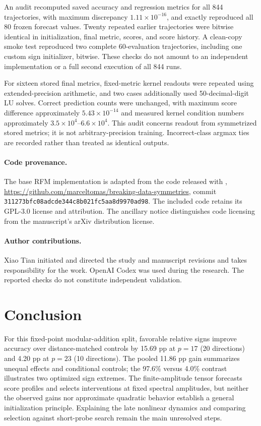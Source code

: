 \documentclass[11pt]{article}
\begin{document}
An audit recomputed saved accuracy and regression metrics for all 844 trajectories, with maximum discrepancy $1.11\times10^{-16}$, and exactly reproduced all 80 frozen forecast values. Twenty repeated earlier trajectories were bitwise identical in initialization, final metric, scores, and score history. A clean-copy smoke test reproduced two complete 60-evaluation trajectories, including one custom sign initializer, bitwise. These checks do not amount to an independent implementation or a full second execution of all 844 runs.

For sixteen stored final metrics, fixed-metric kernel readouts were repeated using extended-precision arithmetic, and two cases additionally used 50-decimal-digit LU solves. Correct prediction counts were unchanged, with maximum score difference approximately $5.43\times10^{-14}$ and measured kernel condition numbers approximately $3.5\times10^4$--$6.6\times10^4$. This audit concerns readout from symmetrized stored metrics; it is not arbitrary-precision training. Incorrect-class argmax ties are recorded rather than treated as identical outputs.

\paragraph{Code provenance.}
The base RFM implementation is adapted from the code released with \citet{bernal2026}, \url{https://github.com/marceltomas/breaking-data-symmetries}, commit \texttt{311273bfc08adcde344c8b021fc5aa8d9970ad98}. The included code retains its GPL-3.0 license and attribution. The ancillary notice distinguishes code licensing from the manuscript's arXiv distribution license.

\paragraph{Author contributions.}
Xiao Tian initiated and directed the study and manuscript revisions and takes responsibility for the work. OpenAI Codex was used during the research. The reported checks do not constitute independent validation.

\section{Conclusion}
For this fixed-point modular-addition split, favorable relative signs improve accuracy over distance-matched controls by 15.69 pp at $p=17$ (20 directions) and 4.20 pp at $p=23$ (10 directions). The pooled 11.86 pp gain summarizes unequal effects and conditional controls; the 97.6\% versus 4.0\% contrast illustrates two optimized sign extremes. The finite-amplitude tensor forecasts score profiles and selects interventions at fixed spectral amplitudes, but neither the observed gains nor approximate quadratic behavior establish a general initialization principle. Explaining the late nonlinear dynamics and comparing selection against short-probe search remain the main unresolved steps.
\end{document}
